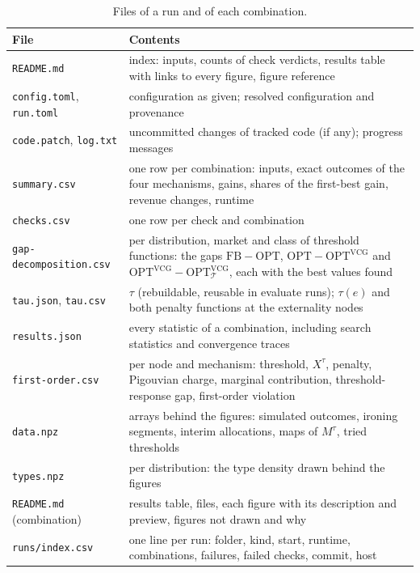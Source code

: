 \documentclass[11pt]{article}
\newcommand{\code}[1]{\texttt{#1}}
\newcommand{\FB}{\mathrm{FB}}
\newcommand{\OPT}{\mathrm{OPT}}
\begin{document}
\begin{table}[ht]
\centering\small
\begin{tabularx}{\linewidth}{@{}l L@{}}
\toprule
File & Contents \\
\midrule
\code{README.md} & index: inputs, counts of check verdicts, results table with links to every figure, figure reference \\
\code{config.toml}, \code{run.toml} & configuration as given; resolved configuration and provenance \\
\code{code.patch}, \code{log.txt} & uncommitted changes of tracked code (if any); progress messages \\
\code{summary.csv} & one row per combination: inputs, exact outcomes of the four mechanisms, gains, shares of the first-best gain, revenue changes, runtime \\
\code{checks.csv} & one row per check and combination \\
\code{gap-decomposition.csv} & per distribution, market and class of threshold functions: the gaps $\FB-\OPT$, $\OPT-\OPT^{\mathrm{VCG}}$ and $\OPT^{\mathrm{VCG}}-\OPT^{\mathrm{VCG}}_{\mathcal T}$, each with the best values found \\
\code{tau.json}, \code{tau.csv} & $\tau$ (rebuildable, reusable in evaluate runs); $\tau(e)$ and both penalty functions at the externality nodes \\
\code{results.json} & every statistic of a combination, including search statistics and convergence traces \\
\code{first-order.csv} & per node and mechanism: threshold, $X^\tau$, penalty, Pigouvian charge, marginal contribution, threshold-response gap, first-order violation \\
\code{data.npz} & arrays behind the figures: simulated outcomes, ironing segments, interim allocations, maps of $M^\tau$, tried thresholds \\
\code{types.npz} & per distribution: the type density drawn behind the figures \\
\code{README.md} (combination) & results table, files, each figure with its description and preview, figures not drawn and why \\
\code{runs/index.csv} & one line per run: folder, kind, start, runtime, combinations, failures, failed checks, commit, host \\
\bottomrule
\end{tabularx}
\caption{Files of a run and of each combination.}
\label{tab:files}
\end{table}
\end{document}
